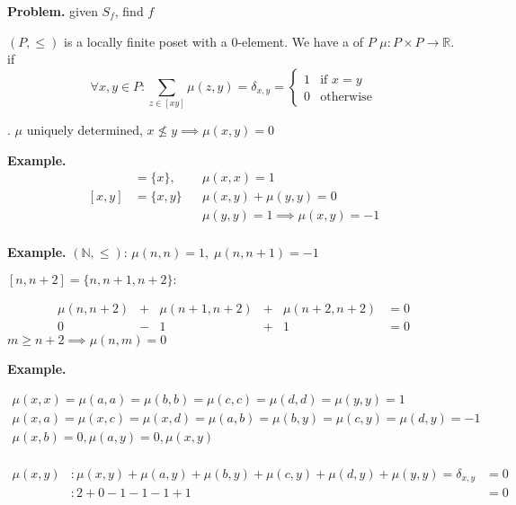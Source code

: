\textbf{Problem.}
given $S_f$, find $f$

\begin{definition}
$(P, \leq)$ is a locally finite poset with a 0-element. 
We have a  of $P$ $\mu: P\times P \rightarrow \mathbb{R}$. 
if 
\[
  \forall x,y \in P: \sum_{z\in [xy]} \mu(z,y) = \delta_{x,y} = 
    \begin{cases}
      1 & \text{if } x = y \\ 
      0 & \text{otherwise}
    \end{cases}
\]
\end{definition}

\Remark.
$\mu$ uniquely determined, $x \not\leq y \implies \mu(x,y) = 0$

\textbf{Example.}
\begin{align*}
  [x,x] & = \{x\}, && \mu(x,x) = 1 \\
  [x,y] &= \{x,y\} && \mu(x,y) + \mu(y,y) = 0 \\
        &          && \mu(y,y) = 1 \implies \mu(x,y) = -1 \\
\end{align*}

\textbf{Example.}
$(\mathbb{N}, \leq)$: $\mu(n,n) = 1,\; \mu(n,n+1) = -1$

$[n,n+2] = \{n,n+1, n+2\}:$

\[
\begin{matrix}
  \mu(n,n+2) & + & \mu(n+1,n+2) & + & \mu(n+2, n+2) & = 0 \\
  0 & -&1 &+&1 & = 0
\end{matrix}
\]
$ m \geq n+2 \implies \mu(n,m) = 0$

\textbf{Example.}

\begin{gather*}
    \mu(x,x) = \mu(a,a) = \mu(b,b) = \mu(c,c) = \mu(d,d) = \mu(y,y) = 1\\
    \mu(x,a) = \mu(x,c) = \mu(x,d) = \mu(a,b) = \mu(b,y) = \mu(c,y) = \mu(d,y) = -1\\
    \mu(x,b) = 0, \mu(a,y) = 0, \mu(x,y) \\
\end{gather*}

\begin{align*}
    \mu(x,y)&: \mu(x,y) + \mu(a,y) + \mu(b,y) + \mu(c,y) + \mu(d,y) + \mu(y,y) = \delta_{x,y} &= 0 \\
        &: 2 +0 -1 -1 -1 +1 &= 0
\end{align*}


